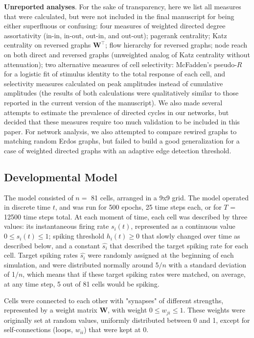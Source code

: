 \documentclass{article}
\begin{document}
\textbf{Unreported analyses}. For the sake of transparency, here we list all measures that were calculated, but were not included in the final manuscript for being either superfluous or confusing: four measures of weighted directed degree assortativity (in-in, in-out, out-in, and out-out); pagerank centrality; Katz centrality on reversed graphs $\mathbf{W}^\top$; flow hierarchy for reversed graphs; node reach on both direct and reversed graphs (unweighted analog of Katz centrality without attenuation); two alternative measures of cell selectivity: McFadden’s pseudo-$R$ for a logistic fit of stimulus identity to the total response of each cell, and selectivity measures calculated on peak amplitudes instead of cumulative amplitudes (the results of both calculations were qualitatively similar to those reported in the current version of the manuscript). We also made several attempts to estimate the prevalence of directed cycles in our networks, but decided that these measures require too much validation to be included in this paper. For network analysis, we also attempted to compare rewired graphs to matching random Erdos graphs, but failed to build a good generalization for a case of weighted directed graphs with an adaptive edge detection threshold.

\subsection*{Developmental Model}

The model consisted of $n=$ 81 cells, arranged in a 9x9 grid. The model operated in discrete time $t$, and was run for 500 epochs, 25 time steps each, or for $T$ = 12500 time steps total. At each moment of time, each cell was described by three values: its instantaneous firing rate $s_i(t)$, represented as a continuous value $0 \leqslant s_i(t) \leqslant 1$; spiking threshold $h_i(t) \geqslant 0$ that slowly changed over time as described below, and a constant $\hat{s_i}$ that described the target spiking rate for each cell. Target spiking rates $\hat{s_i}$ were randomly assigned at the beginning of each simulation, and were distributed normally around 5$ / n$ with a standard deviation of 1$ / n$, which means that if these target spiking rates were matched, on average, at any time step, 5 out of 81 cells would be spiking.

Cells were connected to each other with "synapses" of different strengths, represented by a weight matrix $\mathbf{W}$, with weight $0 \leqslant w_{ji} \leqslant 1$. These weights were originally set at random values, uniformly distributed between 0 and 1, except for self-connections (loops, $w_{ii}$) that were kept at 0.
\end{document}
